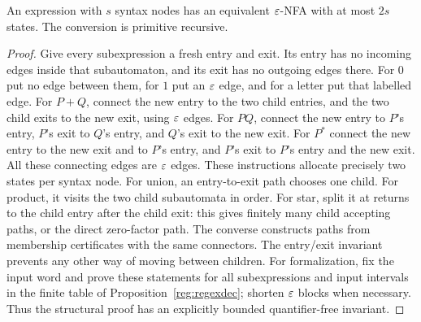 \begin{theorem}\label{reg:thompson}
An expression with $s$ syntax nodes has an equivalent $\varepsilon$-NFA with at
most $2s$ states.  The conversion is primitive recursive.
\end{theorem}
\begin{proof}
Give every subexpression a fresh entry and exit.  Its entry has no incoming
edges inside that subautomaton, and its exit has no outgoing edges there.
For $0$ put no edge between them, for $1$ put an $\varepsilon$ edge, and for a
letter put that labelled edge.  For $P+Q$, connect the new entry to the
two child entries, and the two child exits to the new exit, using $\varepsilon$
edges.  For $PQ$, connect the new entry to $P$'s entry, $P$'s exit to
$Q$'s entry, and $Q$'s exit to the new exit.  For $P^*$ connect the new
entry to the new exit and to $P$'s entry, and $P$'s exit to $P$'s entry
and the new exit.  All these connecting edges are $\varepsilon$ edges.  These
instructions allocate precisely two states per
syntax node.
For union, an entry-to-exit path chooses one child.  For product, it
visits the two child subautomata in order.  For star, split it at returns
to the child entry after the child exit: this gives finitely many child
accepting paths, or the direct zero-factor path.  The converse constructs
paths from membership certificates with the same connectors.  The
entry/exit invariant prevents any other way of moving between children.
For formalization, fix the input word and prove these statements for all
subexpressions and input intervals in the finite table of
Proposition~\ref{reg:regexdec}; shorten $\varepsilon$ blocks when necessary.
Thus the structural proof has an explicitly bounded quantifier-free
invariant.
\end{proof}

